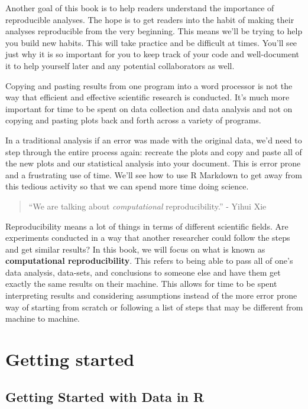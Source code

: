 \documentclass[
  letterpaper,
  DIV=11,
  numbers=noendperiod]{scrreprt}
\theoremstyle{definition}
\theoremstyle{remark}
\begin{document}
Another goal of this book is to help readers understand the importance
of reproducible analyses. The hope is to get readers into the habit of
making their analyses reproducible from the very beginning. This means
we'll be trying to help you build new habits. This will take practice
and be difficult at times. You'll see just why it is so important for
you to keep track of your code and well-document it to help yourself
later and any potential collaborators as well.

Copying and pasting results from one program into a word processor is
not the way that efficient and effective scientific research is
conducted. It's much more important for time to be spent on data
collection and data analysis and not on copying and pasting plots back
and forth across a variety of programs.

In a traditional analysis if an error was made with the original data,
we'd need to step through the entire process again: recreate the plots
and copy and paste all of the new plots and our statistical analysis
into your document. This is error prone and a frustrating use of time.
We'll see how to use R Markdown to get away from this tedious activity
so that we can spend more time doing science.

\begin{quote}
``We are talking about \emph{computational} reproducibility.'' - Yihui
Xie
\end{quote}

Reproducibility means a lot of things in terms of different scientific
fields. Are experiments conducted in a way that another researcher could
follow the steps and get similar results? In this book, we will focus on
what is known as \textbf{computational reproducibility}. This refers to
being able to pass all of one's data analysis, data-sets, and
conclusions to someone else and have them get exactly the same results
on their machine. This allows for time to be spent interpreting results
and considering assumptions instead of the more error prone way of
starting from scratch or following a list of steps that may be different
from machine to machine.

\part{Getting started}

\hypertarget{sec-getting-started}{%
\chapter{Getting Started with Data in R}\label{sec-getting-started}}
\end{document}
